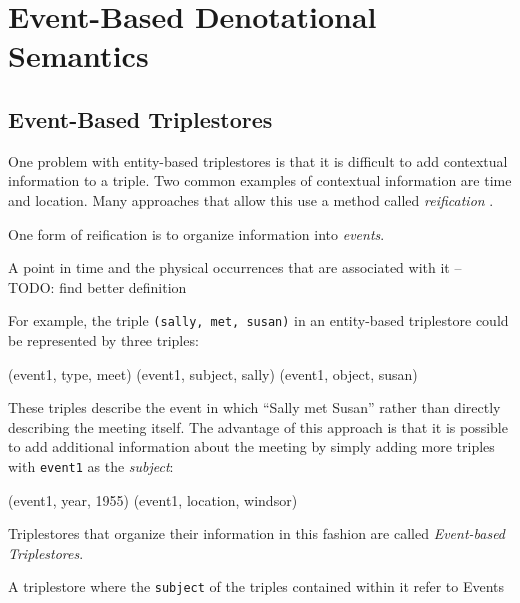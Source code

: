 \documentclass[../main.tex]{subfiles}
\begin{document}
	
\setlength{\abovedisplayskip}{0pt}
\setlength{\belowdisplayskip}{12pt}
\setlength{\abovedisplayshortskip}{0pt}
\setlength{\belowdisplayshortskip}{0pt} 

\chapter {Event-Based Denotational Semantics}

\section{Event-Based Triplestores}

One problem with entity-based triplestores is that it is difficult to add contextual information to a triple.  Two common examples of contextual information are time and location.  Many approaches that allow this use a method called {\em reification} \cite{?}.

One form of reification is to organize information into {\em events}.

\begin{definition}[Event]
	A point in time and the physical occurrences that are associated with it \cite{?} -- TODO: find better definition
\end{definition}

For example, the triple \texttt{(sally, met, susan)} in an entity-based triplestore could be represented by three triples:

\begin{code}
	(event1, type, meet)
	(event1, subject, sally)
	(event1, object, susan)
\end{code}

These triples describe the event in which ``Sally met Susan'' rather than directly describing the meeting itself.  The advantage of this approach is that it is possible to add additional information about the meeting by simply adding more triples with \texttt{event1} as the {\em subject}:

\begin{code}
	(event1, year, 1955)
	(event1, location, windsor)
\end{code}

Triplestores that organize their information in this fashion are called {\em Event-based Triplestores}.

\begin{definition}
	A triplestore where the \texttt{subject} of the triples contained within it refer to Events\cite{frostagboola2014}
\end{definition}
\end{document}
